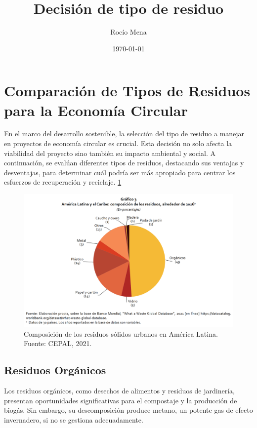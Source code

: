 \documentclass[main.tex]{subfiles}
\title{Decisión de tipo de residuo}
\author{Rocío Mena}
\date{\today}
\begin{document}
\maketitle

\section{Comparación de Tipos de Residuos para la Economía Circular}

En el marco del desarrollo sostenible, la selección del tipo de residuo a manejar en proyectos de economía circular es crucial. Esta decisión no solo afecta la viabilidad del proyecto \cite{baralla2023waste} sino también su impacto ambiental y social. A continuación, se evalúan diferentes tipos de residuos, destacando sus ventajas y desventajas, para determinar cuál podría ser más apropiado para centrar los esfuerzos de recuperación y reciclaje. \ref{fig:waste-latam}

\begin{figure}[h]
	\centering
	\includegraphics[width=1\textwidth]{../assets/waste-types-latam.png}
	\caption{Composición de los residuos sólidos urbanos en América Latina. Fuente: CEPAL, 2021.}
	\label{fig:waste-latam}
\end{figure}

\subsection{Residuos Orgánicos}
Los residuos orgánicos, como desechos de alimentos y residuos de jardinería, presentan oportunidades significativas para el compostaje y la producción de biogás. Sin embargo, su descomposición produce metano, un potente gas de efecto invernadero, si no se gestiona adecuadamente.
\end{document}
